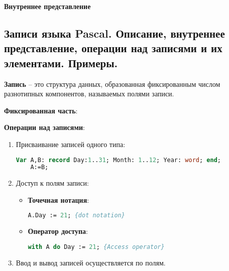 {\bf{Внутреннее представление}}







\newpage\subsection{Записи языка Pascal. Описание, внутреннее представление, операции над записями и их 
элементами. Примеры. }

\begin{myquote}
            
\end{myquote}

{\bf{Запись}} – это структура данных, образованная фиксированным числом разнотипных компонентов, называемых полями записи.


{\bf{Фиксированная часть}}:


{\bf{Операции над записями}}:

\begin{enumerate}
\item Присваивание записей одного типа:

\begin{lstlisting}[language=Pascal]
	Var A,B: record Day:1..31; Month: 1..12; Year: word; end;
	A:=B;
\end{lstlisting}

\item Доступ к полям записи:
\begin{itemize}

\item {\bf{Точечная нотация}}:


\begin{lstlisting}[language=Pascal]
    A.Day := 21; {dot notation}
\end{lstlisting}

\item {\bf{Оператор доступа}}:


\begin{lstlisting}[language=Pascal]
    with A do Day := 21; {Access operator}
\end{lstlisting}

\end{itemize}

\item Ввод и вывод записей осуществляется по полям.

\end{enumerate}
    
